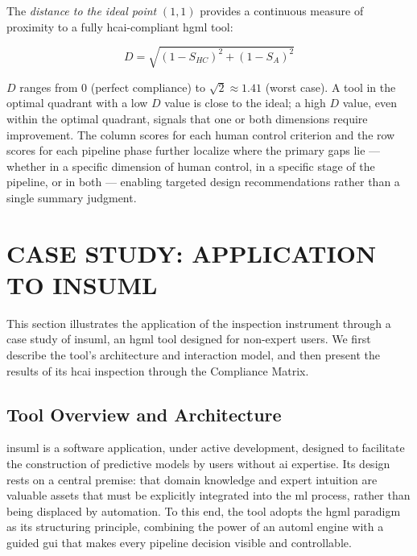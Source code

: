 \documentclass[a4paper,twoside]{article}
\begin{document}
The \emph{distance to the ideal point} $(1, 1)$ provides a continuous
measure of proximity to a fully \gls{hcai}-compliant \gls{hgml} tool:

\begin{equation}
    D = \sqrt{(1 - S_{HC})^2 + (1 - S_{A})^2}
    \label{eq:distance}
\end{equation}

\noindent $D$ ranges from $0$ (perfect compliance) to $\sqrt{2} \approx 1.41$
(worst case). A tool in the optimal quadrant with a low $D$ value is close to
the ideal; a high $D$ value, even within the optimal quadrant, signals that
one or both dimensions require improvement. The column scores for each human 
control criterion and the row scores for each pipeline phase further localize 
where the primary gaps lie --- whether in a specific dimension of human 
control, in a specific stage of the pipeline, or in both --- enabling targeted 
design recommendations rather than a single summary judgment.


\section{\uppercase{Case Study: Application to InsuML}}
\label{sec:application}

This section illustrates the application of the inspection instrument through a case study of \gls{insuml}, an 
\gls{hgml} tool designed for non-expert users. We first describe the tool's 
architecture and interaction model, and then present the results of its 
\gls{hcai} inspection through the Compliance Matrix.

\subsection{Tool Overview and Architecture}
\label{subsec:tool_overview}

\Gls{insuml} is a software application, under active development, designed 
to facilitate the construction of predictive models by users without \gls{ai} 
expertise. Its design rests on a central premise: that domain knowledge and 
expert intuition are valuable assets that must be explicitly integrated into 
the \gls{ml} process, rather than being displaced by automation. To this end, 
the tool adopts the \gls{hgml} paradigm as its structuring principle, 
combining the power of an \gls{automl} engine with a guided \gls{gui} that 
makes every pipeline decision visible and controllable.
\end{document}
